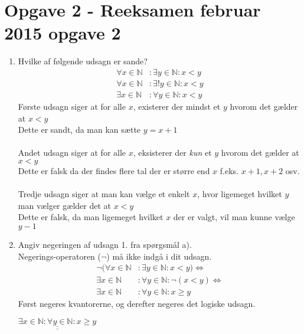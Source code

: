 \documentclass[20pt]{article}
\begin{document}
	\section*{Opgave 2 - Reeksamen februar 2015 opgave 2}
	\begin{enumerate}[label=(\alph*)]
		\item 
		Hvilke af følgende udsagn er sande?
		\begin{align*}
		\forall x \in \mathbb{N}\!&:\exists y \in \mathbb{N}\!: x<y\\
		\forall x \in \mathbb{N}\!&:\exists !y \in \mathbb{N}\!: x<y\\
		\exists x \in \mathbb{N}\!&:\forall y \in \mathbb{N}\!: x<y
		\end{align*}
		Første udsagn siger at for alle \(x\), existerer der mindst et \(y\) hvorom det gælder at \(x<y\)
		\\
		Dette er sandt, da man kan sætte \(y=x+1\)
		\\
		\\
		Andet udsagn siger at for alle \(x\), eksisterer der \emph{kun} et \(y\) hvorom det gælder at \(x<y\)
		\\
		Dette er falsk da der findes flere tal der er større end \(x\) f.eks. \(x+1, x+2\) osv.
		\\
		\\
		Tredje udsagn siger at man kan vælge et enkelt \(x\), hvor ligemeget hvilket \(y\) man vælger gælder det at \(x<y\)
		\\
		Dette er falsk, da man ligemeget hvilket \(x\) der er valgt, vil man kunne vælge \(y-1\)
		\\
		\item
		Angiv negeringen af udsagn 1. fra spørgsmål a).\\
		Negerings-operatoren (\(\neg\)) må ikke indgå i dit udsagn.
		\begin{align*}
		\neg(\forall x \in \mathbb{N}\!&:\exists y \in \mathbb{N}\!: x<y) \Leftrightarrow\\
		\exists x \in \mathbb{N}\!&:\forall y \in \mathbb{N}\!: \neg(x<y)\Leftrightarrow\\
		\exists x \in \mathbb{N}\!&:\forall y \in \mathbb{N}\!: x \geq y
		\end{align*}
		Først negeres kvantorerne, og derefter negeres det logiske udsagn.
		\begin{center}
			$\underline{\underline{\exists x \in \mathbb{N}\!:\forall y \in \mathbb{N}\!:x \geq y}}$\\
		\end{center}
	\end{enumerate}
	\newpage
\end{document}
